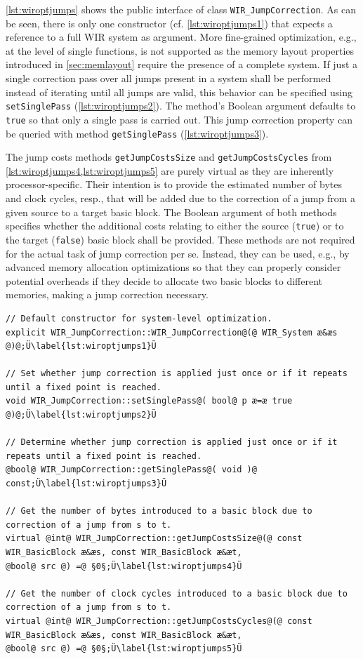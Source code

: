 \cref{lst:wiroptjumps} shows the public interface of class \texttt{WIR\_JumpCorrection}.
As can be seen, there is only one constructor (cf. \cref{lst:wiroptjumps1}) that expects a reference to a full \gls{WIR} system as argument.
More fine-grained optimization, e.g., at the level of single functions, is not supported as the memory layout properties introduced in \cref{sec:memlayout} require the presence of a complete system.
If just a single correction pass over all jumps present in a system shall be performed instead of iterating until all jumps are valid, this behavior can be specified using \texttt{setSinglePass} (\cref{lst:wiroptjumps2}).
The method's Boolean argument defaults to \texttt{true} so that only a single pass is carried out.
This jump correction property can be queried with method \texttt{getSinglePass} (\cref{lst:wiroptjumps3}).

The jump costs methods \texttt{getJumpCostsSize} and \texttt{getJumpCostsCycles} from \cref{lst:wiroptjumps4,lst:wiroptjumps5} are purely virtual as they are inherently processor-specific.
Their intention is to provide the estimated number of bytes and clock cycles, resp., that will be added due to the correction of a jump from a given source to a target basic block.
The Boolean argument of both methods specifies whether the additional costs relating to either the source (\texttt{true}) or to the target (\texttt{false}) basic block shall be provided.
These methods are not required for the actual task of jump correction per se.
Instead, they can be used, e.g., by advanced memory allocation optimizations so that they can properly consider potential overheads if they decide to allocate two basic blocks to different memories, making a jump correction necessary.

\begin{lstlisting}[style=code,float=t,caption={Public Interface of Class \texttt{WIR\_JumpCorrection}},label=lst:wiroptjumps]
// Default constructor for system-level optimization.
explicit WIR_JumpCorrection::WIR_JumpCorrection@(@ WIR_System æ&æs @)@;Ü\label{lst:wiroptjumps1}Ü

// Set whether jump correction is applied just once or if it repeats until a fixed point is reached.
void WIR_JumpCorrection::setSinglePass@( bool@ p æ=æ true @)@;Ü\label{lst:wiroptjumps2}Ü

// Determine whether jump correction is applied just once or if it repeats until a fixed point is reached.
@bool@ WIR_JumpCorrection::getSinglePass@( void )@ const;Ü\label{lst:wiroptjumps3}Ü

// Get the number of bytes introduced to a basic block due to correction of a jump from s to t.
virtual @int@ WIR_JumpCorrection::getJumpCostsSize@(@ const WIR_BasicBlock æ&æs, const WIR_BasicBlock æ&æt,                                                         @bool@ src @) =@ §0§;Ü\label{lst:wiroptjumps4}Ü

// Get the number of clock cycles introduced to a basic block due to correction of a jump from s to t.
virtual @int@ WIR_JumpCorrection::getJumpCostsCycles@(@ const WIR_BasicBlock æ&æs, const WIR_BasicBlock æ&æt,                                                         @bool@ src @) =@ §0§;Ü\label{lst:wiroptjumps5}Ü
\end{lstlisting}

